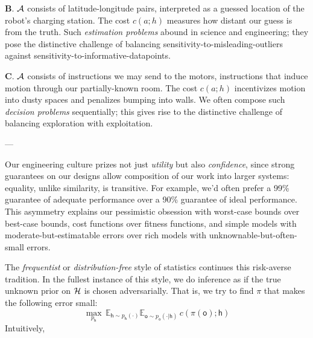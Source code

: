 \documentclass[11pt, justified]{tufte-book}
\newcommand{\gre}{\color{mgre}}
\newcommand{\samquote} [2]{
    \marginnote[-0.6cm]{\begin{flushright}
    \scriptsize
        \gre {\it #1} \\ --- #2
    \end{flushright}}
}
\newcommand{\samsubsubsection}[1]{
   \vspace{0.1cm}
   \par\noindent{\hspace{-2cm}\normalsize \sc \gre #1} ---
}
\newcommand{\Ee}{\mathbb{E}}\newcommand{\eE}{\mathcal{E}}
\newcommand{\sfh}{\mathsf{h}}\newcommand{\frh}{\mathcal{h}}
\newcommand{\sfo}{\mathsf{o}}\newcommand{\fro}{\mathcal{o}}
\theoremstyle{definition}
\begin{document}
      \textbf{B}.
      $\mathcal{A}$ consists of latitude-longitude pairs, interpreted as a guessed
      location of the robot's charging station.  The cost $c(a;h)$ measures how
      distant our guess is from the truth.  
      Such \emph{estimation problems} abound in science and engineering; they
      pose the distinctive challenge of balancing
      sensitivity-to-misleading-outliers against
      sensitivity-to-informative-datapoints.

      \textbf{C}.  $\mathcal{A}$ consists of instructions we may send to the motors,
      instructions that induce motion through our partially-known room.  The
      cost $c(a;h)$ incentivizes motion into dusty spaces and penalizes bumping
      into walls.
      We often compose such \emph{decision problems} sequentially; this gives
      rise to the distinctive challenge of balancing exploration with
      exploitation.

      \samsubsubsection{frequentism and choice of prior}
        Our engineering culture prizes not just \emph{utility} but also
        \emph{confidence}, since strong guarantees on our designs allow 
        composition of our work into larger systems: equality, unlike
        similarity, is transitive.  For example, we'd often prefer a 99\%
        guarantee of adequate performance over a 90\% guarantee of ideal
        performance.  This asymmetry explains our pessimistic obsession with
        worst-case bounds over best-case bounds, cost functions over fitness
        functions, and simple models with moderate-but-estimatable errors over
        rich models with unknownable-but-often-small errors.

        The \emph{frequentist} or \emph{distribution-free} style of statistics
        continues this risk-averse tradition.  In the fullest instance of this
        style, we do inference as if the true unknown prior on $\mathcal{H}$ is chosen
        adversarially.
        That is, we try to find $\pi$ that makes the following error small:
        $$
          \max_{p_{\sfh}}
          \,
          \Ee_{\sfh \sim p_{\sfh}(\cdot)} \Ee_{\sfo \sim p_{\sfo}(\cdot|\sfh)}
          \,
          c(\pi(\sfo); \sfh) 
        $$
        Intuitively, 
\end{document}
